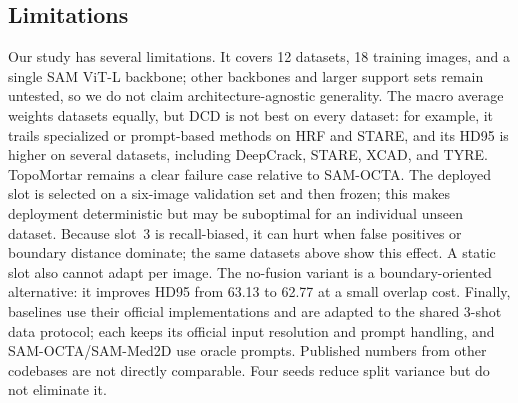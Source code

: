 \subsection{Limitations}
\label{sec:limitations}

Our study has several limitations.  It covers 12 datasets, 18 training
images, and a single SAM ViT-L backbone; other backbones and larger support
sets remain untested, so we do not claim architecture-agnostic generality.  The macro average weights datasets equally, but DCD
is not best on every dataset: for example, it trails specialized or
prompt-based methods on HRF and STARE, and its HD95 is higher on several
datasets, including DeepCrack, STARE, XCAD, and TYRE.  TopoMortar remains a
clear failure case relative to SAM-OCTA.  The
deployed slot is selected on a six-image validation set and then frozen;
this makes deployment deterministic but may be suboptimal for an individual
unseen dataset. Because slot~3 is recall-biased, it can hurt when false
positives or boundary distance dominate; the same datasets above show this
effect. A static slot also cannot adapt per image. The no-fusion variant is a
boundary-oriented alternative: it
improves HD95 from 63.13 to 62.77 at a small overlap cost.  Finally, baselines
use their official implementations and are adapted to the shared 3-shot data
protocol; each keeps its official input resolution and prompt handling, and
SAM-OCTA/SAM-Med2D use oracle prompts.  Published numbers from other codebases
are not directly comparable.  Four seeds reduce split variance but do not
eliminate it.
